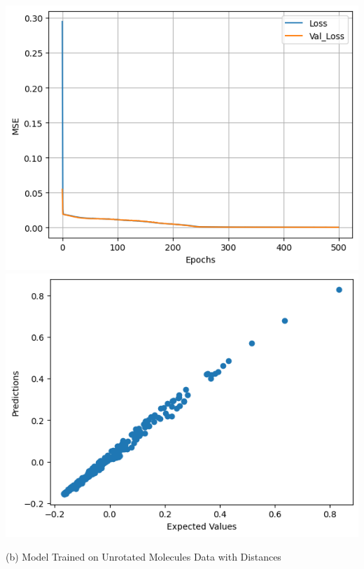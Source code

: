 \documentclass{article}
\begin{document}
\includegraphics[scale=0.5]{../images/dist_unrot.png}
\includegraphics[scale=0.5]{../images/dist_unrot2.png}
\begin{center} (b) Model Trained on Unrotated Molecules Data with Distances \end{center}
\end{document}
